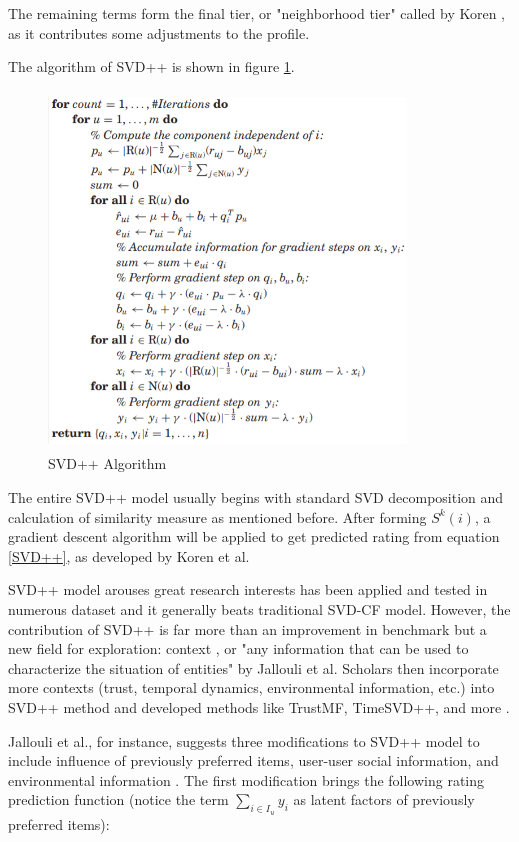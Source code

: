 \documentclass[letter paper, 11pt]{article}
\begin{document}
	The remaining terms form the final tier, or "neighborhood tier" called by Koren \cite{korenFactorization}, as it contributes some adjustments to the profile.
	
	The algorithm of SVD++ is shown in figure \ref{SVD++-Algo}.
	
	\begin{figure}[h]
		\centering
		\caption{SVD++ Algorithm}
		\label{SVD++-Algo}
		\includegraphics[width=9.5cm, height=9.5cm]{SVD++.png}
	\end{figure}
	
	The entire SVD++ model usually begins with standard SVD decomposition and calculation of similarity measure as mentioned before. After forming $S^k(i)$, a gradient descent algorithm will be applied to get predicted rating from equation \ref{SVD++}, as developed by Koren et al\cite{koren2010}.  
	
	SVD++ model arouses great research interests has been applied and tested in numerous dataset \cite{SVD++performance} \cite{korenFactorization} and it generally beats traditional SVD-CF model. However, the contribution of SVD++ is far more than an improvement in benchmark but a new field for exploration: context \cite{contextual}, or "any information that can be used to characterize the situation of entities" by Jallouli et al. Scholars then incorporate more contexts (trust, temporal dynamics, environmental information, etc.) into SVD++ method and developed methods like TrustMF, TimeSVD++, and more \cite{contextual} \cite{review}.
	
			
	Jallouli et al., for instance, suggests three modifications to SVD++ model to include influence of previously preferred items, user-user social information, and environmental information \cite{contextual}. The first modification brings the following rating prediction function (notice the term $\sum_{i \in I_u} y_i$ as latent factors of previously preferred items):
	
\end{document}
